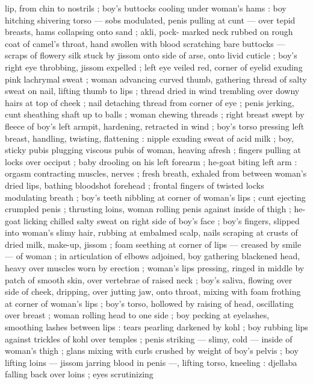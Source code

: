 lip, from chin to nostrils ; boy's buttocks cooling under woman's 
hams : boy hitching shivering torso --- sobs modulated, penis pulling 
at cunt --- over tepid breasts, hams collapsing onto sand ; akli, pock- 
marked neck rubbed on rough coat of camel's throat, hand swollen 
with blood scratching bare buttocks --- scraps of flowery silk stuck 
by jissom onto side of arse, onto livid cuticle ; boy's right eye 
throbbing, jissom expelled ; left eye veiled red, corner of eyelid 
exuding pink lachrymal sweat ; woman advancing curved thumb, 
gathering thread of salty sweat on nail, lifting thumb to lips ; thread 
dried in wind trembling over downy hairs at top of cheek ; nail 
detaching thread from corner of eye ; penis jerking, cunt sheathing 
shaft up to balls ; woman chewing threads ; right breast swept by 
fleece of boy's left armpit, hardening, retracted in wind ; boy's torso 
pressing left breast, handling, twisting, flattening : nipple exuding 
sweat of acid milk ; boy, sticky pubis plugging viscous pubis of 
woman, heaving afresh ; fingers pulling at locks over occiput ; baby 
drooling on his left forearm ; he-goat biting left arm : orgasm 
contracting muscles, nerves ; fresh breath, exhaled from between 
woman's dried lips, bathing bloodshot forehead ; frontal fingers of 
twisted locks modulating breath ; boy's teeth nibbling at corner of 
woman's lips ; cunt ejecting crumpled penis ; thrusting loins, woman 
rolling penis against inside of thigh ; he-goat licking chilled salty 
sweat on right side of boy's face ; boy's fingers, slipped into 
woman's slimy hair, rubbing at embalmed scalp, nails scraping at 
crusts of dried milk, make-up, jissom ; foam seething at corner of 
lips --- creased by smile --- of woman ; in articulation of elbows 
adjoined, boy gathering blackened head, heavy over muscles worn 
by erection ; woman's lips pressing, ringed in middle by patch of 
smooth skin, over vertebrae of raised neck ; boy's saliva, flowing 
over side of cheek, dripping, over jutting jaw, onto throat, mixing with 
foam frothing at corner of woman's lips ; boy's torso, hollowed by 
raising of head, oscillating over breast ; woman rolling head to one 
side ; boy pecking at eyelashes, smoothing lashes between lips : 
tears pearling darkened by kohl ; boy rubbing lips against trickles of 
kohl over temples ; penis striking --- slimy, cold --- inside of 
woman's thigh ; glans mixing with curls crushed by weight of boy's 
pelvis ; boy lifting loins --- jissom jarring blood in penis ---, lifting 
torso, kneeling : djellaba falling back over loins ; eyes scrutinizing 
